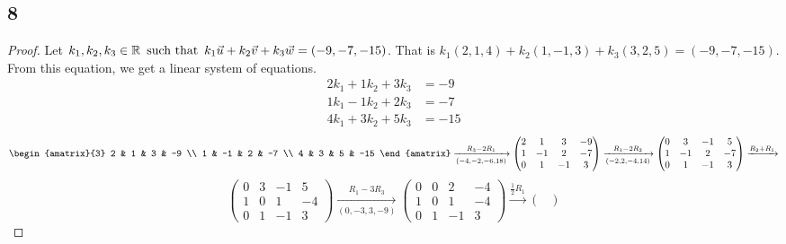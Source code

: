 \subsection*{8}
\begin{enumerate}
  \begin{proof}
    Let $k_1,k_2,k_3 \in \mathbb{R} \operatorname{~\text{such that}~} k_1\vec{u} + k_2\vec{v} + k_3\vec{w} = (-9,-7,-15)$. That is $k_1(2,1,4) + k_2(1,-1,3) + k_3(3,2,5) = (-9,-7,-15)$. From this equation, we get a linear system of equations.
    \begin{align*}
      2k_1 + 1k_2 + 3k_3 & = -9  \\
      1k_1 - 1k_2 + 2k_3 & = -7  \\
      4k_1 + 3k_2 + 5k_3 & = -15
    \end{align*}
    \[
      \begin{amatrix}{3}
        2 & 1 & 3 & -9 \\
        1 & -1 & 2 & -7 \\
        4 & 3 & 5 & -15
      \end{amatrix} \xrightarrow[(-4,-2,-6,18)]{R_3 - 2R_1}
      \begin{pmatrix}
        2 & 1  & 3  & -9 \\
        1 & -1 & 2  & -7 \\
        0 & 1  & -1 & 3
      \end{pmatrix} \xrightarrow[(-2,2,-4,14)]{R_1 - 2R_2}
      \begin{pmatrix}
        0 & 3  & -1 & 5  \\
        1 & -1 & 2  & -7 \\
        0 & 1  & -1 & 3
      \end{pmatrix} \xrightarrow{R_2 + R_1}
    \]
    \[
      \begin{pmatrix}
        0 & 3 & -1 & 5  \\
        1 & 0 & 1  & -4 \\
        0 & 1 & -1 & 3
      \end{pmatrix} \xrightarrow[(0,-3,3,-9)]{R_1 - 3R_3}
      \begin{pmatrix}
        0 & 0 & 2  & -4 \\
        1 & 0 & 1  & -4 \\
        0 & 1 & -1 & 3
      \end{pmatrix} \xrightarrow{\frac{1}{2}R_1}
      \begin{pmatrix}

\end{pmatrix}\]
\end{proof}
\end{enumerate}
